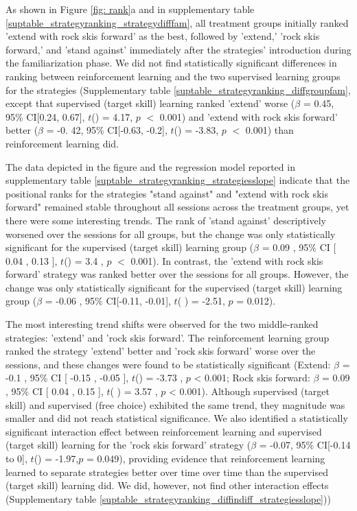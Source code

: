 \documentclass[pdflatex,sn-mathphys-num]{sn-jnl}%
\theoremstyle{thmstyleone}%
\theoremstyle{thmstyletwo}%
\theoremstyle{thmstylethree}%
\begin{document}
As shown in Figure \ref{fig: rank}a and in supplementary table \ref{suptable_strategyranking_strategydifffam}, all treatment groups initially ranked 'extend with rock skis forward' as the best, followed by 'extend,' 'rock skis forward,' and 'stand against' immediately after the strategies' introduction during the familiarization phase. We did not find statistically significant differences in ranking between reinforcement learning and the two supervised learning groups for the strategies (Supplementary table \ref{suptable_strategyranking_diffgroupfam}, except that supervised (target skill) learning ranked 'extend' worse ($\beta$ = 0.45, 95\% CI[0.24,  0.67], $t$() = 4.17, $p$ $<$ 0.001) and 'extend with rock skis forward' better  ($\beta$ = -0. 42, 95\% CI[-0.63, -0.2], $t$() = -3.83, $p$ $<$ 0.001) than reinforcement learning did.

The data depicted in the figure and the regression model reported in supplementary table \ref{suptable_strategyranking_strategiesslope} indicate that the positional ranks for the strategies "stand against" and "extend with rock skis forward" remained stable throughout all sessions across the treatment groups, yet there were some interesting trends. The rank of 'stand against' descriptively worsened over the sessions for all groups, but the change was only statistically significant for the supervised (target skill) learning group  ($\beta$ = 0.09 , 95\% CI [ 0.04 ,  0.13 ], $t$() = 3.4 , $p$  $<$  0.001). In contrast, the 'extend with rock skis forward' strategy was ranked better over the sessions for all groups. However, the change was only statistically significant for the supervised (target skill) learning group ($\beta$ = -0.06 , 95\% CI[-0.11, -0.01], $t$( ) = -2.51, $p$ = 0.012). 

The most interesting trend shifts were observed for the two middle-ranked strategies: 'extend' and 'rock skis forward'. The reinforcement learning group ranked the strategy 'extend' better and 'rock skis forward' worse over the sessions, and these changes were found to be statistically significant (Extend: $\beta$ = -0.1 , 95\% CI [ -0.15 ,  -0.05 ], $t$() = -3.73 , $p$  <  0.001; Rock skis forward:  $\beta$ = 0.09 , 95\% CI [ 0.04 ,  0.15 ], $t$(  ) = 3.57 , $p$  <  0.001). Although supervised (target skill) and supervised (free choice) exhibited the same trend, they magnitude was smaller and did not reach statistical significance. We also identified a statistically significant interaction effect between reinforcement learning and supervised (target skill) learning for the 'rock skis forward' strategy ($\beta$ = -0.07, 95\% CI[-0.14 to 0], $t$() = -1.97,$p$ = 0.049), providing evidence that reinforcement learning learned to separate strategies better over time over time than the supervised (target skill) learning did. We did, however, not find other interaction effects (Supplementary table \ref{suptable_strategyranking_diffindiff_strategiesslope})) 
\end{document}
